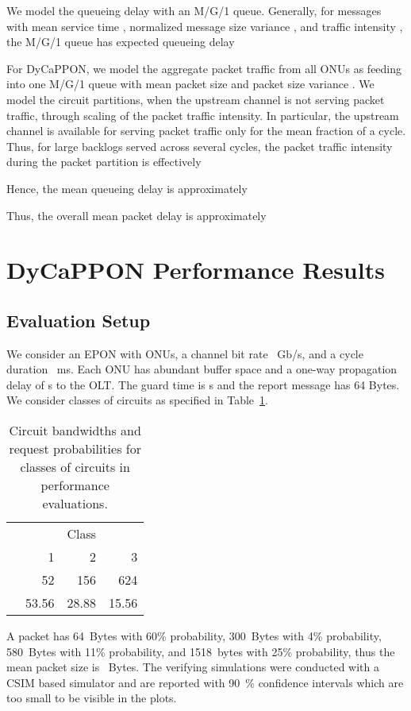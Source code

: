 \documentclass[article]{IEEEtran}
\begin{document}
We model the queueing delay with an M/G/1 queue.
Generally, for messages with mean service time ,
normalized message size variance , and
traffic intensity ,
the M/G/1 queue has expected queueing delay~\cite{Kleinrock75}

For DyCaPPON, we model the aggregate packet traffic from all 
ONUs as feeding into one M/G/1 queue with mean packet size 
and packet size variance .
We model the circuit partitions, when the
upstream channel is not serving packet traffic, through scaling of the
packet traffic intensity.
In particular, the upstream channel is available for
serving packet traffic only for the mean fraction
 of a cycle.
Thus, for large backlogs served across several cycles,
the packet traffic intensity during the packet partition is effectively

Hence, the mean queueing delay is approximately

Thus, the overall mean packet delay is approximately



\section{DyCaPPON Performance Results}
\label{eval:sec}
\subsection{Evaluation Setup}
\label{eval_setup:sec}
We consider an EPON with  ONUs, a channel bit rate ~Gb/s,
and a cycle duration ~ms.
Each ONU has abundant buffer space and a one-way propagation delay
of s to the OLT.
The guard time is s and the report message has 64 Bytes.
We consider  classes of circuits as specified in Table~\ref{cir:tab}.
\begin{table}[t]
\caption{Circuit bandwidths  and request probabilities  for 
classes of circuits in performance evaluations.}
\label{cir:tab}
\vspace{-0.25cm}
\begin{center}
\begin{tabular}{|l|rrr|} \hline
   & \multicolumn{3}{|c|}{Class }\\
   &           1  &   2   &  3   \\ \hline
 [Mb/s] & 52 &  156  & 624   \\
 [\%]   & 53.56   & 28.88    & 15.56  \\
\hline
\end{tabular}
\end{center}
\end{table}
A packet has 64~Bytes with 60\% probability,
300~Bytes with 4\% probability,  580~Bytes with 11\% probability,
and 1518~bytes with 25\% probability, thus
the mean packet size is ~Bytes.
The verifying simulations were conducted with a CSIM based simulator and
are reported with 90~\% confidence intervals which are too
small to be visible in the plots.
\end{document}
